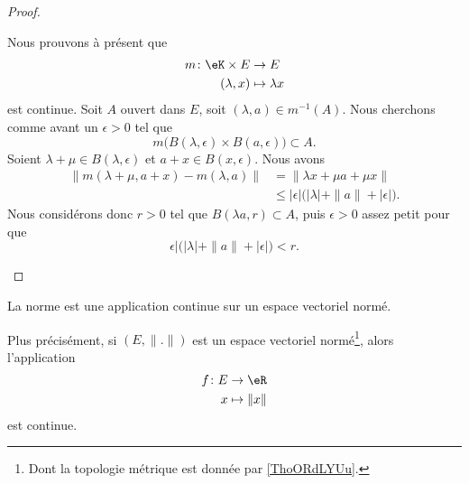 \begin{proof}
\begin{subproof}
		Nous prouvons à présent que
		\begin{equation}
			\begin{aligned}
				m\colon \eK\times E & \to E             \\
				(\lambda,x)         & \mapsto \lambda x
			\end{aligned}
		\end{equation}
		est continue. Soit \( A\) ouvert dans \( E\), soit \( (\lambda, a)\in m^{-1}(A)\). Nous cherchons comme avant un \( \epsilon>0\) tel que
		\begin{equation}
			m\big( B(\lambda,\epsilon)\times B(a,\epsilon) \big)\subset A.
		\end{equation}
		Soient \( \lambda+\mu\in B(\lambda,\epsilon)\) et \( a+x\in B(x,\epsilon)\). Nous avons
		\begin{subequations}
			\begin{align}
				\| m(\lambda+\mu,a+x)- m(\lambda,a) \| & =\| \lambda x+\mu a+\mu x \|                                   \\
				                                       & \leq | \epsilon |\big( | \lambda |+\| a \|+| \epsilon | \big).
			\end{align}
		\end{subequations}
		Nous considérons donc \( r>0\) tel que \( B(\lambda a, r)\subset A\), puis \( \epsilon>0\) assez petit pour que
		\begin{equation}
			\epsilon |\big( | \lambda |+\| a \|+| \epsilon | \big)<r.
		\end{equation}
	\end{subproof}
\end{proof}

\begin{proposition}     \label{PROPooYMCUooERvDpk}
	La norme est une application continue sur un espace vectoriel normé.

	Plus précisément, si \( (E,\| . \|)\) est un espace vectoriel normé\footnote{Dont la topologie métrique est donnée par \ref{ThoORdLYUu}.}, alors l'application
	\begin{equation}
		\begin{aligned}
			f\colon E & \to \eR         \\
			x         & \mapsto \| x \|
		\end{aligned}
	\end{equation}
	est continue.
\end{proposition}

